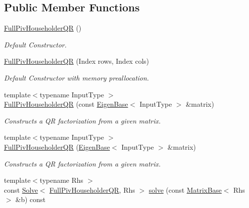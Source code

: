 \subsection*{Public Member Functions}
\begin{DoxyCompactItemize}
\item 
\mbox{\hyperlink{class_eigen_1_1_full_piv_householder_q_r_aeb14b4c1eef33128207b40a00bd0bd08}{Full\+Piv\+Householder\+QR}} ()
\begin{DoxyCompactList}\small\item\em Default Constructor. \end{DoxyCompactList}\item 
\mbox{\hyperlink{class_eigen_1_1_full_piv_householder_q_r_abf722e1dc7241a5d6f76460ef0c87821}{Full\+Piv\+Householder\+QR}} (Index rows, Index cols)
\begin{DoxyCompactList}\small\item\em Default Constructor with memory preallocation. \end{DoxyCompactList}\item 
{\footnotesize template$<$typename Input\+Type $>$ }\\\mbox{\hyperlink{class_eigen_1_1_full_piv_householder_q_r_aeeace3abca6b215025e94c3e098b0a97}{Full\+Piv\+Householder\+QR}} (const \mbox{\hyperlink{struct_eigen_1_1_eigen_base}{Eigen\+Base}}$<$ Input\+Type $>$ \&matrix)
\begin{DoxyCompactList}\small\item\em Constructs a QR factorization from a given matrix. \end{DoxyCompactList}\item 
{\footnotesize template$<$typename Input\+Type $>$ }\\\mbox{\hyperlink{class_eigen_1_1_full_piv_householder_q_r_ac9bdb4f7fa77c1aa16f238592c248e70}{Full\+Piv\+Householder\+QR}} (\mbox{\hyperlink{struct_eigen_1_1_eigen_base}{Eigen\+Base}}$<$ Input\+Type $>$ \&matrix)
\begin{DoxyCompactList}\small\item\em Constructs a QR factorization from a given matrix. \end{DoxyCompactList}\item 
{\footnotesize template$<$typename Rhs $>$ }\\const \mbox{\hyperlink{class_eigen_1_1_solve}{Solve}}$<$ \mbox{\hyperlink{class_eigen_1_1_full_piv_householder_q_r}{Full\+Piv\+Householder\+QR}}, Rhs $>$ \mbox{\hyperlink{class_eigen_1_1_full_piv_householder_q_r_a6f1b0a116c78e642e3d2a100a29d1a4a}{solve}} (const \mbox{\hyperlink{class_eigen_1_1_matrix_base}{Matrix\+Base}}$<$ Rhs $>$ \&b) const

\end{DoxyCompactItemize}
